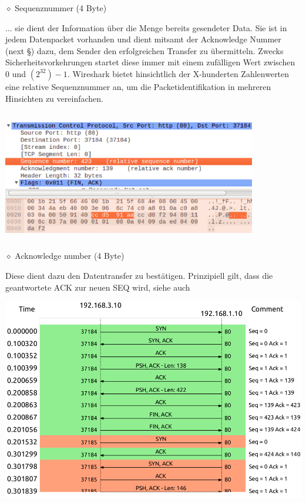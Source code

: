 \documentclass[11pt]{article}
\begin{document}
\begin{enumerate}[\thesection .1]
        $\diamond$ Sequenznummer (4 Byte)
        \begin{addmargin}[1em]{1em}
            ... sie dient der Information über die Menge bereits gesendeter Data. Sie ist in jedem Datenpacket vorhanden und
            dient mitsamt der Acknowledge Nummer (next §) dazu, dem Sender den erfolgreichen Transfer zu übermitteln. Zwecks Sicherheitsvorkehrungen startet diese immer
            mit einem zufälligen Wert zwischen 0 und $(2^32)-1$. Wireshark bietet hinsichtlich der X-hunderten Zahlenwerten eine relative
            Sequenznummer an, um die Packetidentifikation in mehreren Hinsichten zu vereinfachen.\\\\
            \includegraphics[width=30em, height=15em]{SequenceNumber.png}
        \end{addmargin}
\pagebreak
        $\diamond$ Acknowledge number (4 Byte)
        \begin{addmargin}[1em]{1em}
            Diese dient dazu den Datentransfer zu bestätigen.
            Prinzipiell gilt, dass die geantwortete ACK zur neuen SEQ wird, siehe auch
            \begin{center}
                \includegraphics[width=\textwidth]{SeqAckFlowgraph.png}
            \end{center}


\end{addmargin}
\end{enumerate}
\end{document}
